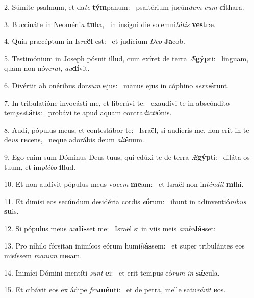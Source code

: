2. Súmite psalmum, et da\textit{te} \textbf{tým}panum: \ast\  psaltérium jucún\textit{dum} \textit{cum} \textbf{cí}thara.\

3. Buccináte in Neoméni\textit{a} \textbf{tu}ba, \ast\  in insígni die solemni\textit{tá}\textit{tis} \textbf{ves}træ.\

4. Quia præcéptum in Is\textit{ra}\textbf{ël} est: \ast\  et judícium \textit{De}\textit{o} \textbf{Ja}cob.\

5. Testimónium in Joseph pósuit illud, cum exíret de terra \textit{Æ}\textbf{gýp}ti: \ast\  linguam, quam non nóve\textit{rat}, \textit{au}\textbf{dí}vit.\

6. Divértit ab onéribus dor\textit{sum} \textbf{e}jus: \ast\  manus ejus in cóphino \textit{ser}\textit{vi}\textbf{é}runt.\

7. In tribulatióne invocásti me, et liberávi te: \dag\  exaudívi te in abscóndito tem\textit{pes}\textbf{tá}tis: \ast\  probávi te apud aquam contra\textit{dic}\textit{ti}\textbf{ó}nis.\

8. Audi, pópulus meus, et contestábor te: \dag\  Israël, si audíeris me, non erit in te de\textit{us} \textbf{re}cens, \ast\  neque adorábis deum \textit{a}\textit{li}\textbf{é}num.\

9. Ego enim sum Dóminus Deus tuus, qui edúxi te de terra \textit{Æ}\textbf{gýp}ti: \ast\  diláta os tuum, et im\textit{plé}\textit{bo} \textbf{il}lud.\

10. Et non audívit pópulus meus vo\textit{cem} \textbf{me}am: \ast\  et Israël non in\textit{tén}\textit{dit} \textbf{mi}hi.\

11. Et dimísi eos secúndum desidéria cordis \textit{e}\textbf{ó}rum: \ast\  ibunt in adinventió\textit{ni}\textit{bus} \textbf{su}is.\

12. Si pópulus meus \textit{au}\textbf{dís}set me: \ast\  Israël si in viis meis \textit{am}\textit{bu}\textbf{lás}set:\

13. Pro níhilo fórsitan inimícos eórum humi\textit{li}\textbf{ás}sem: \ast\  et super tribulántes eos misíssem \textit{ma}\textit{num} \textbf{me}am.\

14. Inimíci Dómini mentíti \textit{sunt} \textbf{e}i: \ast\  et erit tempus eó\textit{rum} \textit{in} \textbf{sǽ}cula.\

15. Et cibávit eos ex ádipe \textit{fru}\textbf{mén}ti: \ast\  et de petra, melle satu\textit{rá}\textit{vit} \textbf{e}os.\

